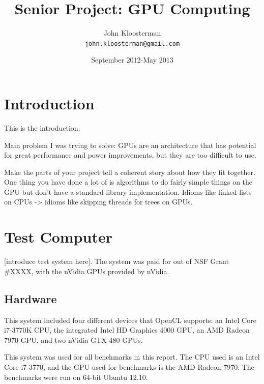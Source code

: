 \documentclass{article}
\begin{document}
\lstset{ 
  language=C++,
  belowcaptionskip=1\baselineskip,
  xleftmargin=\parindent,
  basicstyle=\footnotesize\ttfamily
 }

\title{Senior Project: GPU Computing}
\author{John Kloosterman \\
  \texttt{john.kloosterman@gmail.com}}
\date{September 2012-May 2013}
\maketitle

\section{Introduction}
This is the introduction.

Main problem I was trying to solve: GPUs are an architecture that has potential for great performance and power improvements, but they are too difficult to use.

Make the parts of your project tell a coherent story about how they fit together. One thing you have done a lot of is algorithms to do fairly simple things on the GPU but don't have a standard library implementation. Idioms like linked lists on CPUs -> idioms like skipping threads for trees on GPUs.



\tableofcontents

\section{Test Computer}
[introduce test system here]. The system was paid for out of NSF Grant \#XXXX, with the nVidia GPUs provided by nVidia.

\subsection{Hardware}
This system included four different devices that OpenCL supports: an Intel Core i7-3770K CPU, the integrated Intel HD Graphics 4000 GPU, an AMD Radeon 7970 GPU, and two nVidia GTX 480 GPUs.

This system was used for all benchmarks in this report. The CPU used is an Intel Core i7-3770, and the GPU used for benchmarks is the AMD Radeon 7970. The benchmarks were run on 64-bit Ubuntu 12.10.
\end{document}
